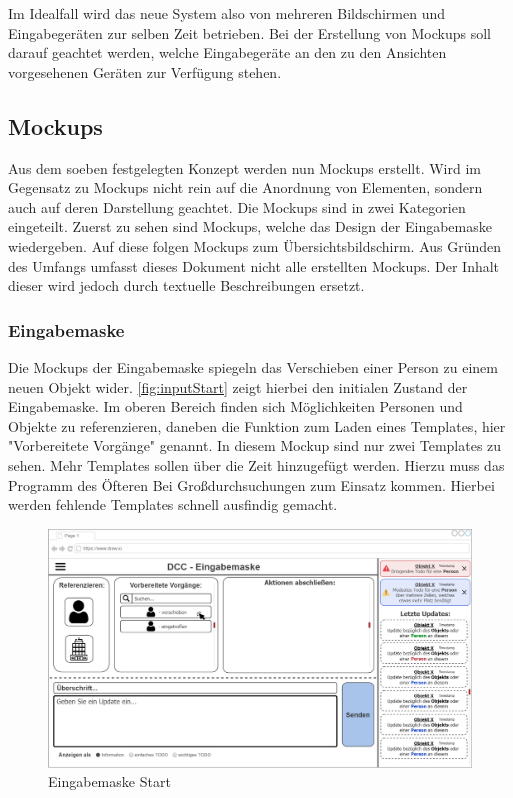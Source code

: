 Im Idealfall wird das neue System also von mehreren Bildschirmen und Eingabegeräten zur selben Zeit betrieben. 
Bei der Erstellung von Mockups soll darauf geachtet werden, welche Eingabegeräte an den zu den Ansichten vorgesehenen Geräten zur Verfügung stehen.

\subsection{Mockups}

Aus dem soeben festgelegten Konzept werden nun Mockups erstellt.
Wird im Gegensatz zu Mockups nicht rein auf die Anordnung von Elementen, sondern auch auf deren Darstellung geachtet.
Die Mockups sind in zwei Kategorien eingeteilt. 
Zuerst zu sehen sind Mockups, welche das Design der Eingabemaske wiedergeben.
Auf diese folgen Mockups zum Übersichtsbildschirm.
Aus Gründen des Umfangs umfasst dieses Dokument nicht alle erstellten Mockups.
Der Inhalt dieser wird jedoch durch textuelle Beschreibungen ersetzt.

\subsubsection{Eingabemaske}

Die Mockups der Eingabemaske spiegeln das Verschieben einer Person zu einem neuen Objekt wider.
\autoref{fig:inputStart} zeigt hierbei den initialen Zustand der Eingabemaske.
Im oberen Bereich finden sich Möglichkeiten Personen und Objekte zu referenzieren, daneben die Funktion zum Laden eines Templates, hier "Vorbereitete Vorgänge" genannt.
In diesem Mockup sind nur zwei Templates zu sehen.
Mehr Templates sollen über die Zeit hinzugefügt werden.
Hierzu muss das Programm des Öfteren Bei Großdurchsuchungen zum Einsatz kommen.
Hierbei werden fehlende Templates schnell ausfindig gemacht.

\begin{figure}[htp]
    \centering
    \includegraphics[width=\textwidth]{images/1-MockupsV1/InputScreenStart.jpg}
    \caption{Eingabemaske Start}
    \label{fig:inputStart}
\end{figure}

